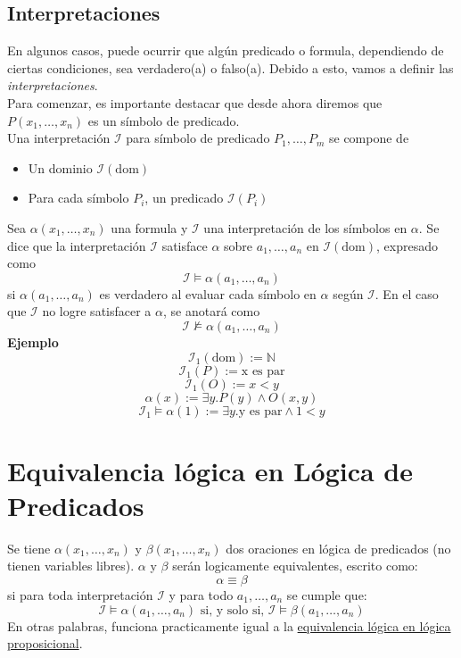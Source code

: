 \documentclass[../main.tex]{subfiles}
\begin{document}
\subsection{Interpretaciones}
En algunos casos, puede ocurrir que algún predicado o formula, dependiendo de ciertas condiciones, sea verdadero(a)
o falso(a). Debido a esto, vamos a definir las \textit{interpretaciones}.\\
Para comenzar, es importante destacar que desde ahora diremos que $P(x_{1}, \ldots, x_{n})$ es un símbolo de predicado.\\
Una interpretación $\mathcal{I}$ para símbolo de predicado $P_{1}, \ldots, P_{m}$ se compone de
\begin{itemize}
    \item Un dominio $\mathcal{I}(\text{dom})$
    \item Para cada símbolo $P_{i}$, un predicado $\mathcal{I}(P_{i})$
\end{itemize}
Sea $\alpha{}(x_{1}, \ldots, x_{n})$ una formula y $\mathcal{I}$ una interpretación de los símbolos en $\alpha$. Se dice que la interpretación $\mathcal{I}$ satisface $\alpha$ sobre $a_{1}, \ldots, a_{n}$ en $\mathcal{I}(\text{dom})$, expresado como
$$\mathcal{I} \models \alpha{}(a_{1}, \ldots, a_{n})$$
si $\alpha{}(a_{1}, \ldots, a_{n})$ es verdadero al evaluar cada símbolo en $\alpha$ según $\mathcal{I}$. En el caso que $\mathcal{I}$ no logre satisfacer a $\alpha$, se anotará como
$$\mathcal{I} \not\models \alpha{}(a_{1}, \ldots, a_{n})$$
\textbf{Ejemplo}
$$\mathcal{I}_{1}(\text{dom}) := \mathds{N}$$
$$\mathcal{I}_{1}(P) := \text{x es par}$$
$$\mathcal{I}_{1}(O) := x < y$$
$$\alpha{}(x) := \exists y . P(y) \wedge O(x,y)$$
$$\mathcal{I}_{1} \models \alpha{}(1) := \exists y. \text{y es par} \wedge 1 < y$$

\section{Equivalencia lógica en Lógica de Predicados}
Se tiene $\alpha{}(x_{1}, \ldots, x_{n})$ y $\beta{}(x_{1}, \ldots, x_{n})$ dos oraciones en lógica de predicados (no tienen variables libres). $\alpha$ y $\beta$ serán logicamente equivalentes, escrito como:
$$\alpha \equiv \beta$$
si para toda interpretación $\mathcal{I}$ y para todo $a_{1}, \ldots, a_{n}$ se cumple que:
$$\mathcal{I} \models \alpha{}(a_{1}, \ldots, a_{n}) \text{ si, y solo si, } \mathcal{I} \models \beta{}(a_{1}, \ldots, a_{n})$$
En otras palabras, funciona practicamente igual a la \hyperref[sec:equiv_logica]{equivalencia lógica en lógica 
proposicional}.
\end{document}
